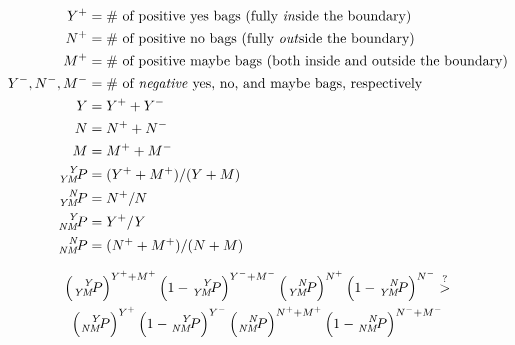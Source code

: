 \documentclass[12pt,twoside]{article}
\newcommand{\term}[1]{\emph{#1}}
\newcommand{\sspre}[3]{\ce{^{\mathit{#2}}_{\mathit{#3}}}\hspace{-1pt}#1}
\begin{document}
\begin{align*}
  Y^+ &= \text{\# of positive yes bags (fully \emph{in}side the boundary)} \\
  N^+ &= \text{\# of positive no bags (fully \emph{out}side the boundary)} \\
  M^+ &=
    \text{\# of positive maybe bags (both inside and outside the boundary)} \\
  Y^-, N^-, M^- &=
    \text{\# of \term{negative} yes, no, and maybe bags, respectively} \\
  Y &= Y^+ + Y^- \\
  N &= N^+ + N^- \\
  M &= M^+ + M^- \\
  \sspre{P}{Y}{YM} &= (Y^+ + M^+) / (Y + M) \\
  \sspre{P}{N}{YM} &= N^+ / N \\
  \sspre{P}{Y}{NM} &= Y^+ / Y \\
  \sspre{P}{N}{NM} &= (N^+ + M^+) / (N + M)
\end{align*}

\begin{multline}
  \left(\sspre{P}{Y}{YM}\right)^{Y^+ + M^+}
  \left(1 - \sspre{P}{Y}{YM}\right)^{Y^- + M^-}
  \left(\sspre{P}{N}{YM}\right)^{N^+}
  \left(1 - \sspre{P}{N}{YM}\right)^{N^-}
  \stackrel{?}{>} \\
  \left(\sspre{P}{Y}{NM}\right)^{Y^+}
  \left(1 - \sspre{P}{Y}{NM}\right)^{Y^-}
  \left(\sspre{P}{N}{NM}\right)^{N^+ + M^+}
  \left(1 - \sspre{P}{N}{NM}\right)^{N^- + M^-}
\end{multline}
\end{document}
